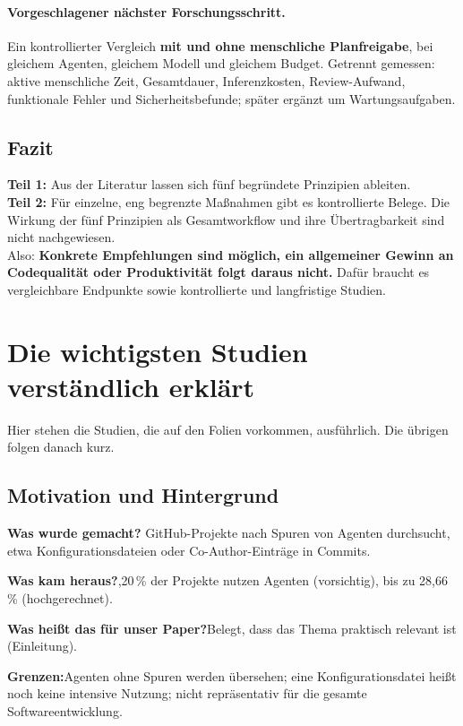 \documentclass[11pt,a4paper,parskip=half]{scrartcl}
\newcommand{\studie}[6]{%
\begin{tcolorbox}[colback=white,colframe=akzent!50,arc=2pt,boxrule=0.6pt,
  title={\textbf{#1}\hfill\small #2},fonttitle=\color{white},colbacktitle=akzent!80]
\textbf{Was wurde gemacht?}\enskip #3\par
\textbf{Was kam heraus?}\enskip #4\par
\textbf{Was heißt das für unser Paper?}\enskip #5\par
\textbf{Grenzen:}\enskip #6
\end{tcolorbox}}
\begin{document}
\paragraph{Vorgeschlagener nächster Forschungsschritt.}
Ein kontrollierter Vergleich \textbf{mit und ohne menschliche Planfreigabe}, bei gleichem Agenten, gleichem Modell und gleichem Budget. Getrennt gemessen: aktive menschliche Zeit, Gesamtdauer, Inferenzkosten, Review-Aufwand, funktionale Fehler und Sicherheitsbefunde; später ergänzt um Wartungsaufgaben.

\subsection{Fazit}
\begin{kernbox}
\textbf{Teil 1:} Aus der Literatur lassen sich fünf begründete Prinzipien ableiten.\\
\textbf{Teil 2:} Für einzelne, eng begrenzte Maßnahmen gibt es kontrollierte Belege. Die Wirkung der fünf Prinzipien als Gesamtworkflow und ihre Übertragbarkeit sind nicht nachgewiesen.\\[3pt]
Also: \textbf{Konkrete Empfehlungen sind möglich, ein allgemeiner Gewinn an Codequalität oder Produktivität folgt daraus nicht.} Dafür braucht es vergleichbare Endpunkte sowie kontrollierte und langfristige Studien.
\end{kernbox}

\section{Die wichtigsten Studien verständlich erklärt}
Hier stehen die Studien, die auf den Folien vorkommen, ausführlich. Die übrigen folgen danach kurz.

\subsection{Motivation und Hintergrund}
\studie{Robbes et al. (2026): \enquote{Agentic much?}}{ACM TOSEM}
{128.018 GitHub-Projekte nach Spuren von Agenten durchsucht, etwa Konfigurationsdateien oder Co-Author-Einträge in Commits.}
{22,20\,\% der Projekte nutzen Agenten (vorsichtig), bis zu 28,66\,\% (hochgerechnet).}
{Belegt, dass das Thema praktisch relevant ist (Einleitung).}
{Agenten ohne Spuren werden übersehen; eine Konfigurationsdatei heißt noch keine intensive Nutzung; nicht repräsentativ für die gesamte Softwareentwicklung.}
\end{document}
